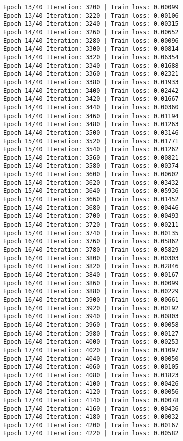 \documentclass[11pt]{article}
\begin{document}
\begin{Verbatim}[commandchars=\\\{\}]
Epoch 13/40 Iteration: 3200 | Train loss: 0.00099
Epoch 13/40 Iteration: 3220 | Train loss: 0.00106
Epoch 13/40 Iteration: 3240 | Train loss: 0.00315
Epoch 14/40 Iteration: 3260 | Train loss: 0.00652
Epoch 14/40 Iteration: 3280 | Train loss: 0.00096
Epoch 14/40 Iteration: 3300 | Train loss: 0.00814
Epoch 14/40 Iteration: 3320 | Train loss: 0.06354
Epoch 14/40 Iteration: 3340 | Train loss: 0.01688
Epoch 14/40 Iteration: 3360 | Train loss: 0.02321
Epoch 14/40 Iteration: 3380 | Train loss: 0.01933
Epoch 14/40 Iteration: 3400 | Train loss: 0.02442
Epoch 14/40 Iteration: 3420 | Train loss: 0.01667
Epoch 14/40 Iteration: 3440 | Train loss: 0.00360
Epoch 14/40 Iteration: 3460 | Train loss: 0.01194
Epoch 14/40 Iteration: 3480 | Train loss: 0.01263
Epoch 14/40 Iteration: 3500 | Train loss: 0.03146
Epoch 15/40 Iteration: 3520 | Train loss: 0.01771
Epoch 15/40 Iteration: 3540 | Train loss: 0.01262
Epoch 15/40 Iteration: 3560 | Train loss: 0.00821
Epoch 15/40 Iteration: 3580 | Train loss: 0.00374
Epoch 15/40 Iteration: 3600 | Train loss: 0.00602
Epoch 15/40 Iteration: 3620 | Train loss: 0.03432
Epoch 15/40 Iteration: 3640 | Train loss: 0.05936
Epoch 15/40 Iteration: 3660 | Train loss: 0.01452
Epoch 15/40 Iteration: 3680 | Train loss: 0.00446
Epoch 15/40 Iteration: 3700 | Train loss: 0.00493
Epoch 15/40 Iteration: 3720 | Train loss: 0.00211
Epoch 15/40 Iteration: 3740 | Train loss: 0.00135
Epoch 16/40 Iteration: 3760 | Train loss: 0.05862
Epoch 16/40 Iteration: 3780 | Train loss: 0.05829
Epoch 16/40 Iteration: 3800 | Train loss: 0.00303
Epoch 16/40 Iteration: 3820 | Train loss: 0.02846
Epoch 16/40 Iteration: 3840 | Train loss: 0.00167
Epoch 16/40 Iteration: 3860 | Train loss: 0.00099
Epoch 16/40 Iteration: 3880 | Train loss: 0.00229
Epoch 16/40 Iteration: 3900 | Train loss: 0.00661
Epoch 16/40 Iteration: 3920 | Train loss: 0.00192
Epoch 16/40 Iteration: 3940 | Train loss: 0.00803
Epoch 16/40 Iteration: 3960 | Train loss: 0.00058
Epoch 16/40 Iteration: 3980 | Train loss: 0.00127
Epoch 16/40 Iteration: 4000 | Train loss: 0.00253
Epoch 17/40 Iteration: 4020 | Train loss: 0.01097
Epoch 17/40 Iteration: 4040 | Train loss: 0.00050
Epoch 17/40 Iteration: 4060 | Train loss: 0.00105
Epoch 17/40 Iteration: 4080 | Train loss: 0.01823
Epoch 17/40 Iteration: 4100 | Train loss: 0.00426
Epoch 17/40 Iteration: 4120 | Train loss: 0.00056
Epoch 17/40 Iteration: 4140 | Train loss: 0.00078
Epoch 17/40 Iteration: 4160 | Train loss: 0.00436
Epoch 17/40 Iteration: 4180 | Train loss: 0.00032
Epoch 17/40 Iteration: 4200 | Train loss: 0.00167
Epoch 17/40 Iteration: 4220 | Train loss: 0.00582

\end{Verbatim}
\end{document}
